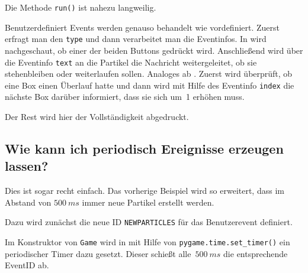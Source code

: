 
Die Methode \texttt{run()} ist nahezu langweilig.


Benutzerdefiniert Events werden genauso behandelt wie vordefiniert. Zuerst erfragt man den \texttt{type} und dann verarbeitet man die Eventinfos. In  wird nachgeschaut, ob einer der beiden Buttons gedrückt wird. Anschließend wird über die Eventinfo \texttt{text} an die Partikel die Nachricht weitergeleitet, ob sie stehenbleiben oder weiterlaufen sollen. Analoges ab . Zuerst wird überprüft, ob eine Box einen Überlauf hatte und dann wird mit Hilfe des Eventinfo \texttt{index} die nächste Box darüber informiert, dass sie sich um~1 erhöhen muss.


Der Rest wird hier der Vollständigkeit abgedruckt.


\subsection{Wie kann ich periodisch Ereignisse erzeugen lassen?}

Dies ist sogar recht einfach. Das vorherige Beispiel wird so erweitert, dass im Abstand von $500~ms$ immer neue Partikel erstellt werden.

Dazu wird zunächst die neue ID \texttt{NEWPARTICLES} für das Benutzerevent definiert.


Im Konstruktor von \texttt{Game} wird in  mit Hilfe von \texttt{pygame.time.set\_timer()} ein periodischer Timer dazu gesetzt. Dieser schießt alle~$500~ms$ die entsprechende EventID ab.


